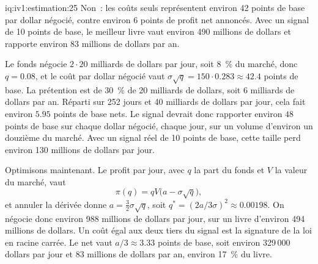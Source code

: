\begin{solution}{iq:iv1:estimation:25}
Non~: les coûts seuls représentent environ 42 points de base par dollar négocié, contre environ 6 points de profit net annoncés. Avec un signal de 10 points de base, le meilleur livre vaut environ 490 millions de dollars et rapporte environ 83 millions de dollars par an.

Le fonds négocie $2 \cdot 20$ milliards de dollars par jour, soit 8~\% du marché, donc $q = 0.08$, et le coût par dollar négocié vaut $\sigma\sqrt{q} = 150 \cdot 0.283 \approx 42.4$ points de base. La prétention est de 30~\% de 20 milliards de dollars, soit 6 milliards de dollars par an. Réparti sur 252 jours et 40 milliards de dollars par jour, cela fait environ $5.95$ points de base nets. Le signal devrait donc rapporter environ $48$ points de base sur chaque dollar négocié, chaque jour, sur un volume d'environ un douzième du marché. Avec un signal réel de 10 points de base, cette taille perd environ 130 millions de dollars par jour.

Optimisons maintenant. Le profit par jour, avec $q$ la part du fonds et $V$ la valeur du marché, vaut
\[
\pi(q) = qV\bigl(a - \sigma\sqrt{q}\bigr),
\]
et annuler la dérivée donne $a = \tfrac32\sigma\sqrt{q}$, soit $q^* = (2a/3\sigma)^2 \approx 0.00198$. On négocie donc environ 988 millions de dollars par jour, sur un livre d'environ 494 millions de dollars. Un coût égal aux deux tiers du signal est la signature de la loi en racine carrée. Le net vaut $a/3 \approx 3.33$ points de base, soit environ 329\,000 dollars par jour et 83 millions de dollars par an, environ 17~\% du livre.

\end{solution}
